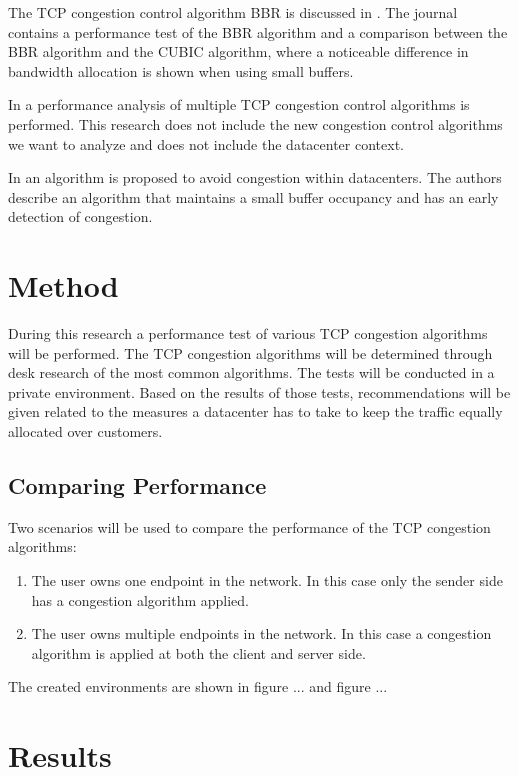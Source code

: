 \documentclass{article}
\begin{document}

The TCP congestion control algorithm BBR is discussed in \cite{bbr-congestion}.
The journal contains a performance test of the BBR algorithm and a comparison
between the BBR algorithm and the CUBIC algorithm, where a noticeable
difference in bandwidth allocation is shown when using small buffers.

In \cite{multiple-congestion} a performance analysis of multiple TCP congestion
control algorithms is performed. This research does not include the new
congestion control algorithms we want to analyze and does not include the
datacenter context.

In \cite{dctcp-congestion-original} an algorithm is proposed to avoid
congestion within datacenters. The authors describe an algorithm that maintains
a small buffer occupancy and has an early detection of congestion.


\section{Method}
During this research a performance test of various TCP congestion algorithms will be performed. The TCP congestion algorithms will be determined through desk research of the most common algorithms. The tests will be conducted in a private environment. Based on the results of those tests, recommendations will be given related to the measures a datacenter has to take to keep the traffic equally allocated over customers. 
	
	\subsection{Comparing Performance}
	Two scenarios will be used to compare the performance of the TCP congestion algorithms:
	\begin{enumerate}
		\item The user owns one endpoint in the network. In this case only the sender side has a congestion algorithm applied.
		\item The user owns multiple endpoints in the network. In this case a congestion algorithm is applied at both the client and server side.
	\end{enumerate}
	
	The created environments are shown in figure ... and figure ...
	
\section{Results}
\end{document}
